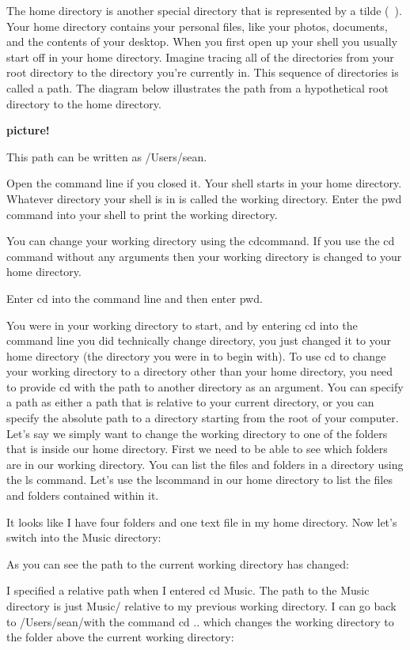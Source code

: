 The home directory is another special directory that is represented by a tilde (~). Your home directory contains your personal files, like your photos, documents, and the contents of your desktop. When you first open up your shell you usually start off in your home directory. Imagine tracing all of the directories from your root directory to the directory you’re currently in. This sequence of directories is called a path. The diagram below illustrates the path from a hypothetical root directory to the home directory.

\textbf{picture!}

This path can be written as /Users/sean.

Open the command line if you closed it. Your shell starts in your home directory. Whatever directory your shell is in is called the working directory. Enter the pwd command into your shell to print the working directory.

You can change your working directory using the cdcommand. If you use the cd command without any arguments then your working directory is changed to your home directory.

Enter cd into the command line and then enter pwd.

You were in your working directory to start, and by entering cd into the command line you did technically change directory, you just changed it to your home directory (the directory you were in to begin with). To use cd to change your working directory to a directory other than your home directory, you need to provide cd with the path to another directory as an argument. You can specify a path as either a path that is relative to your current directory, or you can specify the absolute path to a directory starting from the root of your computer. Let’s say we simply want to change the working directory to one of the folders that is inside our home directory. First we need to be able to see which folders are in our working directory. You can list the files and folders in a directory using the ls command. Let’s use the lscommand  in our home directory to list the files and folders contained within it.


It looks like I have four folders and one text file in my home directory. Now let’s switch into the Music directory:


As you can see the path to the current working directory has changed:

I specified a relative path when I entered cd Music. The path to the Music directory is just Music/ relative to my previous working directory. I can go back to /Users/sean/with the command cd .. which changes the working directory to the folder above the current working directory:

